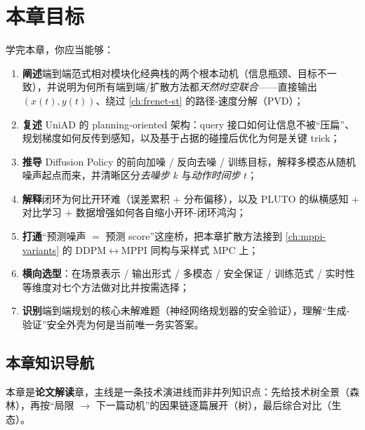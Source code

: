 \section*{本章目标}
学完本章，你应当能够：
\begin{enumerate}
  \item \textbf{阐述}端到端范式相对模块化经典栈的两个根本动机（信息瓶颈、目标不一致），并说明为何所有端到端/扩散方法都\emph{天然时空联合}——直接输出 $(x(t),y(t))$、绕过 \cref{ch:frenet-st} 的路径-速度分解（PVD）；
  \item \textbf{复述} UniAD 的 planning-oriented 架构：query 接口如何让信息不被“压扁”、规划梯度如何反传到感知，以及基于占据的碰撞后优化为何是关键 trick；
  \item \textbf{推导} Diffusion Policy 的前向加噪 / 反向去噪 / 训练目标，解释多模态从随机噪声起点而来，并清晰区分\emph{去噪步} $k$ 与\emph{动作时间步} $t$；
  \item \textbf{解释}闭环为何比开环难（误差累积 $+$ 分布偏移），以及 PLUTO 的纵横感知 $+$ 对比学习 $+$ 数据增强如何各自缩小开环-闭环鸿沟；
  \item \textbf{打通}“预测噪声 $=$ 预测 score”这座桥，把本章扩散方法接到 \cref{ch:mppi-variants} 的 DDPM$\leftrightarrow$MPPI 同构与采样式 MPC 上；
  \item \textbf{横向选型}：在场景表示 / 输出形式 / 多模态 / 安全保证 / 训练范式 / 实时性等维度对七个方法做对比并按需选择；
  \item \textbf{识别}端到端规划的核心未解难题（神经网络规划器的安全验证），理解“生成-验证”安全外壳为何是当前唯一务实答案。
\end{enumerate}

\subsection*{本章知识导航}
本章是\textbf{论文解读}章，主线是一条技术演进线而非并列知识点：先给技术树全景（森林），再按“局限 $\to$ 下一篇动机”的因果链逐篇展开（树），最后综合对比（生态）。

